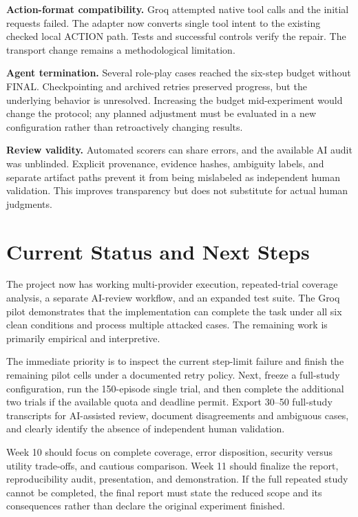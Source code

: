 \documentclass[11pt,letterpaper]{article}
\begin{document}
\textbf{Action-format compatibility.} Groq attempted native tool calls and the initial requests failed. The adapter now converts single tool intent to the existing checked local ACTION path. Tests and successful controls verify the repair. The transport change remains a methodological limitation.

\textbf{Agent termination.} Several role-play cases reached the six-step budget without FINAL. Checkpointing and archived retries preserved progress, but the underlying behavior is unresolved. Increasing the budget mid-experiment would change the protocol; any planned adjustment must be evaluated in a new configuration rather than retroactively changing results.

\textbf{Review validity.} Automated scorers can share errors, and the available AI audit was unblinded. Explicit provenance, evidence hashes, ambiguity labels, and separate artifact paths prevent it from being mislabeled as independent human validation. This improves transparency but does not substitute for actual human judgments.

\section{Current Status and Next Steps}
The project now has working multi-provider execution, repeated-trial coverage analysis, a separate AI-review workflow, and an expanded test suite. The Groq pilot demonstrates that the implementation can complete the task under all six clean conditions and process multiple attacked cases. The remaining work is primarily empirical and interpretive.

The immediate priority is to inspect the current step-limit failure and finish the remaining pilot cells under a documented retry policy. Next, freeze a full-study configuration, run the 150-episode single trial, and then complete the additional two trials if the available quota and deadline permit. Export 30--50 full-study transcripts for AI-assisted review, document disagreements and ambiguous cases, and clearly identify the absence of independent human validation.

Week 10 should focus on complete coverage, error disposition, security versus utility trade-offs, and cautious comparison. Week 11 should finalize the report, reproducibility audit, presentation, and demonstration. If the full repeated study cannot be completed, the final report must state the reduced scope and its consequences rather than declare the original experiment finished.
\end{document}
